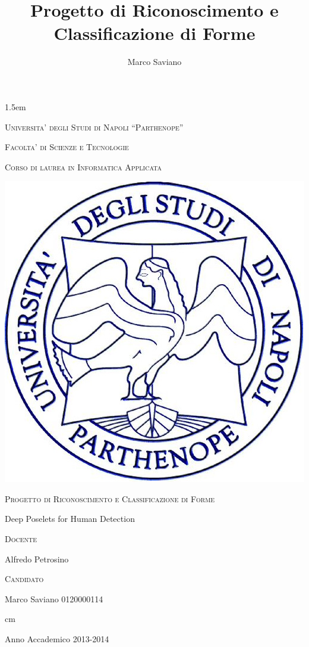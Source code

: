 \documentclass[12pt,italian,a4paper,oneside,openright]{book}
\title{Progetto di Riconoscimento e Classificazione di Forme}
\author{Marco Saviano}
\begin{document}

\baselineskip 1.5em

{ \thispagestyle{empty}


\vskip 1cm \large \centerline{\textsc{Universita' degli Studi di Napoli ``Parthenope''}}

\centerline {\textsc{Facolta' di Scienze e Tecnologie}}

\centerline {\small\textsc{Corso di laurea in Informatica Applicata}}

\begin{center}
\includegraphics[scale=0.24]{logo_parthenope}
\end{center}

\vskip 0.5cm

\large \centerline {\textsc{Progetto di Riconoscimento e Classificazione di Forme}}

\vskip 0.5cm

\Large \centerline {Deep Poselets for Human Detection}


\vskip 4.5cm


\large
\begin{minipage}[t]{7cm}
\textsc{Docente}

Alfredo Petrosino

\end{minipage}
\hfill
\begin{minipage}[t]{5cm}
\hfill \textsc{Candidato}

\hfill Marco Saviano
\hfill 0120000114\\
\end{minipage}

 cm \Large \centerline {Anno Accademico 2013-2014}
\vfill \eject}
\end{document}
